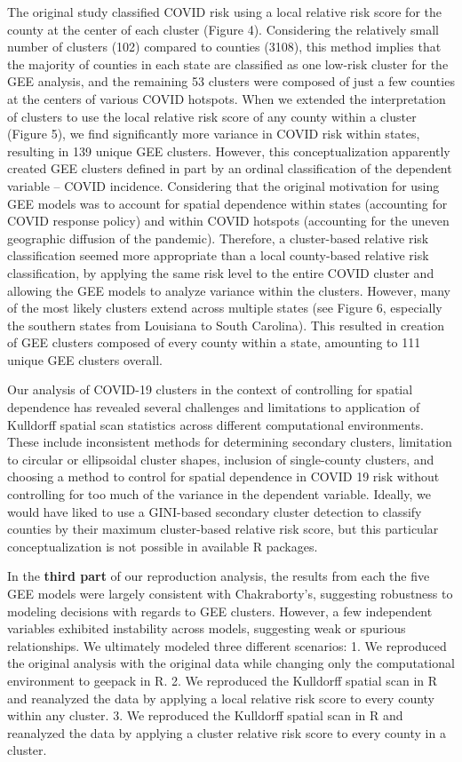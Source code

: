 \documentclass[
]{article}
\begin{document}
The original study classified COVID risk using a local relative risk
score for the county at the center of each cluster (Figure 4).
Considering the relatively small number of clusters (102) compared to
counties (3108), this method implies that the majority of counties in
each state are classified as one low-risk cluster for the GEE analysis,
and the remaining 53 clusters were composed of just a few counties at
the centers of various COVID hotspots. When we extended the
interpretation of clusters to use the local relative risk score of any
county within a cluster (Figure 5), we find significantly more variance
in COVID risk within states, resulting in 139 unique GEE clusters.
However, this conceptualization apparently created GEE clusters defined
in part by an ordinal classification of the dependent variable -- COVID
incidence. Considering that the original motivation for using GEE models
was to account for spatial dependence within states (accounting for
COVID response policy) and within COVID hotspots (accounting for the
uneven geographic diffusion of the pandemic). Therefore, a cluster-based
relative risk classification seemed more appropriate than a local
county-based relative risk classification, by applying the same risk
level to the entire COVID cluster and allowing the GEE models to analyze
variance within the clusters. However, many of the most likely clusters
extend across multiple states (see Figure 6, especially the southern
states from Louisiana to South Carolina). This resulted in creation of
GEE clusters composed of every county within a state, amounting to 111
unique GEE clusters overall.

Our analysis of COVID-19 clusters in the context of controlling for
spatial dependence has revealed several challenges and limitations to
application of Kulldorff spatial scan statistics across different
computational environments. These include inconsistent methods for
determining secondary clusters, limitation to circular or ellipsoidal
cluster shapes, inclusion of single-county clusters, and choosing a
method to control for spatial dependence in COVID 19 risk without
controlling for too much of the variance in the dependent variable.
Ideally, we would have liked to use a GINI-based secondary cluster
detection to classify counties by their maximum cluster-based relative
risk score, but this particular conceptualization is not possible in
available R packages.

In the \textbf{third part} of our reproduction analysis, the results
from each the five GEE models were largely consistent with
Chakraborty's, suggesting robustness to modeling decisions with regards
to GEE clusters. However, a few independent variables exhibited
instability across models, suggesting weak or spurious relationships. We
ultimately modeled three different scenarios: 1. We reproduced the
original analysis with the original data while changing only the
computational environment to geepack in R. 2. We reproduced the
Kulldorff spatial scan in R and reanalyzed the data by applying a local
relative risk score to every county within any cluster. 3. We reproduced
the Kulldorff spatial scan in R and reanalyzed the data by applying a
cluster relative risk score to every county in a cluster.
\end{document}

